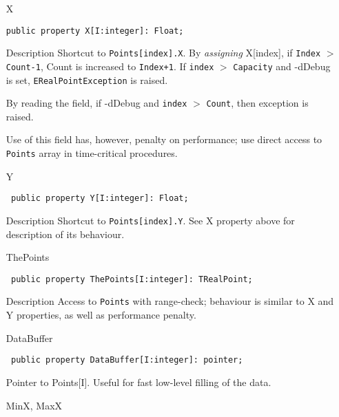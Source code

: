 \documentclass[12pt,a4paper,oneside]{report}
\newcommand{\declarationitem}[1]{{\addfontfeatures{FakeBold=1.3} #1}}
\newcommand{\descriptiontitle}[1]{{\addfontfeatures{FakeSlant}#1}}
\newcommand{\code}[1]{\texttt{#1}}
\begin{document}
\begin{itemize}
	\item[\declarationitem{X}\hfill]
	\begin{flushleft}
		\code{public property X[I:integer]: Float;}
	\end{flushleft}
	\item[\descriptiontitle{Description}]
	Shortcut to \code{Points[index].X}. By \textit{assigning} X[index], if  \code{Index} $>$ \code{Count-1}, Count is increased to \code{Index+1}. If \code{index} $>$ \code{Capacity} and -dDebug is set, \code{ERealPointException} is raised. 
	
	By reading the field, if -dDebug and \code{index} $>$ \code{Count}, then exception is raised.
	
	Use of this field has, however, penalty on performance; use direct access to \code{Points} array in time-critical procedures. 
	\par  \label{lmPointsVec.TPoints-Y}
	\item[\declarationitem{Y}\hfill]
	\begin{flushleft}
		\code{
			public property Y[I:integer]: Float;}
	\end{flushleft}
	\item[\descriptiontitle{Description}]
	Shortcut to \code{Points[index].Y}. See X property above for description of its behaviour. 
	\par  \label{lmPointsVec.TPoints-ThePoints}
	\item[\declarationitem{ThePoints}\hfill]
	\begin{flushleft}
		\code{
			public property ThePoints[I:integer]: TRealPoint;}
	\end{flushleft}
	\item[\descriptiontitle{Description}]
	Access to \code{Points} with range-check; behaviour is similar to X and Y properties, as well as performance penalty.
	\par  \label{lmPointsVec.TPoints-DataBuffer}
	\item[\declarationitem{DataBuffer}\hfill]
	\begin{flushleft}
		\code{
			public property DataBuffer[I:integer]: pointer;}
	\end{flushleft}
	\par Pointer to Points[I]. Useful for fast low-level filling of the data.\label{lmPointsVec.TPoints-MinX}
	\item[\declarationitem{MinX, MaxX}\hfill]
	\begin{flushleft}

\end{flushleft}
\end{itemize}
\end{document}
